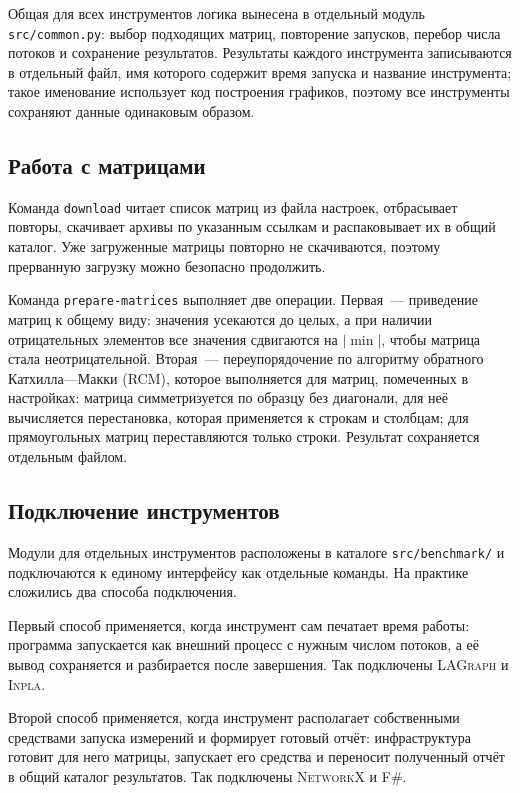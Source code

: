 Общая для всех инструментов логика вынесена в отдельный модуль \texttt{src/common.py}: выбор подходящих матриц, повторение запусков, перебор числа потоков и сохранение результатов. Результаты каждого инструмента записываются в отдельный файл, имя которого содержит время запуска и название инструмента; такое именование использует код построения графиков, поэтому все инструменты сохраняют данные одинаковым образом.

\subsection{Работа с матрицами}
\label{subsec:matrixwork}

Команда \texttt{download} читает список матриц из файла настроек, отбрасывает повторы, скачивает архивы по указанным ссылкам и распаковывает их в общий каталог. Уже загруженные матрицы повторно не скачиваются, поэтому прерванную загрузку можно безопасно продолжить.

Команда \texttt{prepare-matrices} выполняет две операции. Первая~--- приведение матриц к общему виду: значения усекаются до целых, а при наличии отрицательных элементов все значения сдвигаются на $|\min|$, чтобы матрица стала неотрицательной. Вторая~--- переупорядочение по алгоритму обратного Катхилла---Макки (\textsc{RCM}), которое выполняется для матриц, помеченных в настройках: матрица симметризуется по образцу без диагонали, для неё вычисляется перестановка, которая применяется к строкам и столбцам; для прямоугольных матриц переставляются только строки. Результат сохраняется отдельным файлом.

\subsection{Подключение инструментов}
\label{subsec:integration}

Модули для отдельных инструментов расположены в каталоге \texttt{src/benchmark/} и подключаются к единому интерфейсу как отдельные команды. На практике сложились два способа подключения.

Первый способ применяется, когда инструмент сам печатает время работы: программа запускается как внешний процесс с нужным числом потоков, а её вывод сохраняется и разбирается после завершения. Так подключены \textsc{LAGraph} и \textsc{Inpla}.

Второй способ применяется, когда инструмент располагает собственными средствами запуска измерений и формирует готовый отчёт: инфраструктура готовит для него матрицы, запускает его средства и переносит полученный отчёт в общий каталог результатов. Так подключены \textsc{NetworkX} и \textsc{F\#}.

